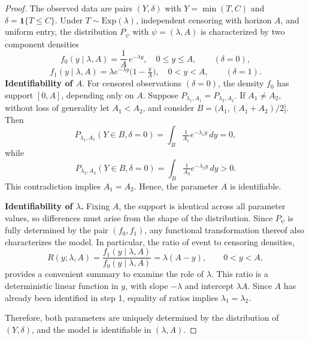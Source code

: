 \begin{proof}
The observed data are pairs $(Y,\delta)$ with $Y=\min(T,C)$ and $\delta=\mathbf 1\{T\le C\}$. 
Under $T\sim\text{Exp}(\lambda)$, independent censoring with horizon $A$, and uniform entry, 
the distribution $P_\psi$ with $\psi=(\lambda,A)$ is characterized by two component densities
\begin{equation}
f_0(y\mid\lambda,A)=\frac{1}{A}\,e^{-\lambda y}, \quad 0\le y\le A, \qquad (\delta=0),
\end{equation}
\begin{equation}
f_1(y\mid\lambda,A)=\lambda e^{-\lambda y}\Big(1-\tfrac{y}{A}\Big), \quad 0<y<A, \qquad (\delta=1).
\end{equation}
\textbf{Identifiability of $A$}. 
For censored observations $(\delta=0)$, the density $f_0$ has support $[0,A]$, depending only on $A$. Suppose $P_{\lambda_1,A_1}=P_{\lambda_2,A_2}$. If $A_1\ne A_2$, without loss of generality let $A_1<A_2$, 
and consider $B=(A_1,(A_1+A_2)/2]$. Then
\begin{equation}
P_{\lambda_1,A_1}(Y\in B,\delta=0)=\int_B \tfrac{1}{A_1}e^{-\lambda_1 y}\,dy=0,
\end{equation}
while
\begin{equation}
P_{\lambda_2,A_2}(Y\in B,\delta=0)=\int_B \tfrac{1}{A_2}e^{-\lambda_2 y}\,dy>0.
\end{equation}
This contradiction implies $A_1=A_2$. Hence, the parameter $A$ is identifiable.

\textbf{Identifiability of $\lambda$.}
Fixing $A$, the support is identical across all parameter values, so differences must arise from the shape of the distribution. Since $P_\psi$ is fully determined by the pair $(f_0,f_1)$, any functional transformation thereof also characterizes the model. In particular, the ratio of event to censoring densities,
\begin{equation}
R(y;\lambda,A)=\frac{f_1(y\mid\lambda,A)}{f_0(y\mid\lambda,A)}=\lambda(A-y), \qquad 0<y<A ,
\end{equation}
provides a convenient summary to examine the role of $\lambda$. This ratio is a deterministic linear function in $y$, with slope $-\lambda$ and intercept $\lambda A$. Since $A$ has already been identified in step 1, equality of ratios implies $\lambda_1=\lambda_2$. 

Therefore, both parameters are uniquely determined by the distribution of $(Y,\delta)$, and the model is identifiable in $(\lambda,A)$.
\end{proof}

